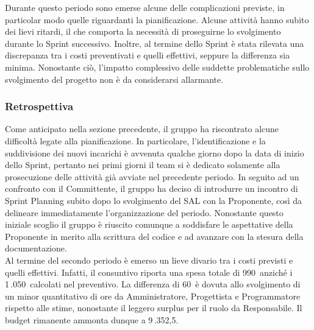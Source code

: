 Durante questo periodo sono emerse alcune delle complicazioni previste, in particolar modo quelle riguardanti la pianificazione. Alcune attività hanno subito dei lievi ritardi, il che comporta la necessità di proseguirne lo svolgimento durante lo Sprint successivo. Inoltre, al termine dello Sprint è stata rilevata una discrepanza tra i costi preventivati e quelli effettivi, seppure la differenza sia minima. Nonostante ciò, l'impatto complessivo delle suddette problematiche sullo svolgimento del progetto non è da considerarsi allarmante.
\subsubsection{Retrospettiva}
Come anticipato nella sezione precedente, il gruppo ha riscontrato alcune difficoltà legate alla pianificazione. In particolare, l'identificazione e la suddivisione dei nuovi incarichi è avvenuta qualche giorno dopo la data di inizio dello Sprint, pertanto nei primi giorni il team si è dedicato solamente alla prosecuzione delle attività già avviate nel precedente periodo. In seguito ad un confronto con il Committente, il gruppo ha deciso di introdurre un incontro di Sprint Planning subito dopo lo svolgimento del SAL con la Proponente, così da delineare immediatamente l'organizzazione del periodo. Nonostante questo iniziale scoglio il gruppo è riuscito comunque a soddisfare le aspettative della Proponente in merito alla scrittura del codice e ad avanzare con la stesura della documentazione. \\
Al termine del secondo periodo è emerso un lieve divario tra i costi previsti e quelli effettivi.
Infatti, il consuntivo riporta una spesa totale di 990\;\texteuro\ anziché i 1\,.050\;\texteuro\ calcolati
nel preventivo. La differenza di 60\;\texteuro\ è dovuta allo svolgimento di un minor quantitativo di
ore da Amministratore, Progettista e Programmatore rispetto alle stime, nonostante il leggero
surplus per il ruolo da Responsabile. Il budget rimanente ammonta dunque a 9\,.352,5\;\texteuro. 
